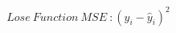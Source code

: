 \documentclass[preview]{standalone}
\begin{document}
\begin{align*}
Lose~Function~MSE~:(y_i - \hat{y}_i)^2
\end{align*}
\end{document}
